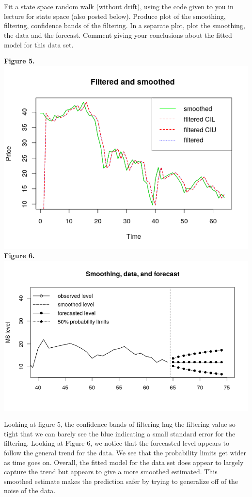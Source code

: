 \documentclass[11pt]{article}
\begin{document}
\section{}
Fit a state space random walk (without drift), using the code given to you in lecture for state space (also posted below).  Produce plot of the smoothing, filtering, confidence bands of the filtering. In a separate plot, plot the smoothing, the data and the forecast. Comment giving your conclusions about the fitted model for this data set. 
\begin{center}
\textbf{Figure 5.} \\
\includegraphics[scale=1]{filSmo}
\\
\textbf{Figure 6.} \\
\includegraphics[scale=1]{foreSmo}
\end{center}
Looking at figure 5, the confidence bands of filtering hug the filtering value so tight that we can barely see the blue indicating a small standard error for the filtering. Looking at Figure 6, we notice that the forecasted level appears to follow the general trend for the data. We see that the probability limits get wider as time goes on. Overall, the fitted model for the data set does appear to largely capture the trend but appears to give a more smoothed estimated. This smoothed estimate makes the prediction safer by trying to generalize off of the noise of the data.
\end{document}
